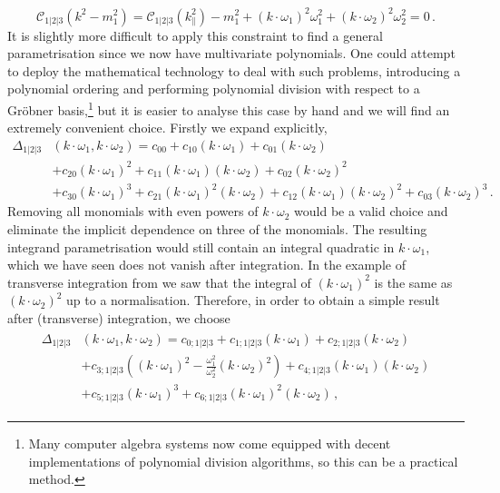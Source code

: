 \begin{equation}
  \mathcal{C}_{1|2|3} \left( k^2 - m_1^2 \right) = \mathcal{C}_{1|2|3} \left( k_{\parallel}^2 \right) - m_1^2 + (k\cdot\omega_1)^2 \omega_1^2 + (k\cdot\omega_2)^2 \omega_2^2 = 0 \,.
  \label{eq:triksqcondition}
\end{equation}
It is slightly more difficult to apply this constraint to find a general
parametrisation since we now have multivariate polynomials. One could attempt
to deploy the mathematical technology to deal with such problems, introducing a
polynomial ordering and performing polynomial division with respect to a
Gr\"{o}bner basis,\footnote{Many computer algebra systems now come equipped with
decent implementations of polynomial division algorithms, so this can be a
practical method.} but it is easier to analyse this case by hand and
we will find an extremely convenient choice. Firstly we expand
 explicitly,
\begin{align}
  \Delta_{1|2|3}&(k\cdot\omega_1, k\cdot\omega_2) = c_{00}
  + c_{10} (k\cdot\omega_1) 
  + c_{01} (k\cdot\omega_2) \nonumber\\& 
  + c_{20} (k\cdot\omega_1)^2
  + c_{11} (k\cdot\omega_1) (k\cdot\omega_2) 
  + c_{02} (k\cdot\omega_2)^2 \nonumber\\& 
  + c_{30} (k\cdot\omega_1)^3
  + c_{21} (k\cdot\omega_1)^2 (k\cdot\omega_2)
  + c_{12} (k\cdot\omega_1) (k\cdot\omega_2)^2
  + c_{03} (k\cdot\omega_2)^3 \,.
  \label{eq:triparam2}
\end{align}
Removing all monomials with even powers of $k\cdot\omega_2$ would be a valid choice
and eliminate the implicit dependence on three of the monomials. The resulting
integrand parametrisation would still contain an integral quadratic in
$k\cdot\omega_1$, which we have seen does not vanish after integration. In the example of transverse integration from  we saw that the integral of
$(k\cdot\omega_1)^2$ is the same as $(k\cdot\omega_2)^2$ up to a normalisation.
Therefore, in order to obtain a simple result after (transverse) integration, we choose
\begin{align} 
\begin{aligned}
  \Delta_{1|2|3}&(k\cdot\omega_1, k\cdot\omega_2) = c_{0;1|2|3}
  + c_{1;1|2|3} (k\cdot\omega_1) 
  + c_{2;1|2|3} (k\cdot\omega_2) \\& 
  + c_{3;1|2|3} \left((k\cdot\omega_1)^2 - \frac{\omega_1^2}{\omega_2^2} (k\cdot\omega_2)^2 \right)
  + c_{4;1|2|3} (k\cdot\omega_1) (k\cdot\omega_2) \\&
  + c_{5;1|2|3} (k\cdot\omega_1)^3
  + c_{6;1|2|3} (k\cdot\omega_1)^2 (k\cdot\omega_2) \,,
\end{aligned}
\label{eq:triparam}
\end{align}
